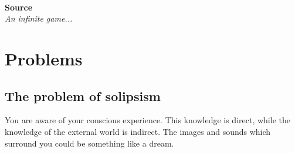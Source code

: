 \documentclass[oneside,hidelinks]{article}
\begin{document}
\thispagestyle{empty}


~
\vspace{125px}

\begin{center}
{\Huge \textbf{Source}}\\
\vspace{10px}
{\textit{An infinite game...}}\\
\end{center}

\vspace{125px}

\begin{center}
\end{center}

\newpage

\restoregeometry


\tableofcontents

\newpage

% 

\section{Problems}

\subsection{The problem of solipsism}

You are aware of your conscious experience.
This knowledge is direct, while the knowledge of the external world is indirect.
The images and sounds which surround you could be something like a dream.\\
\end{document}
